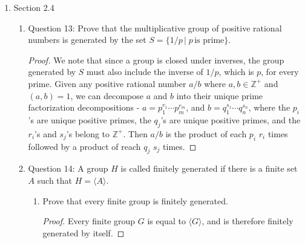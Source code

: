 \documentclass{article}
\begin{document}
\begin{enumerate}
\begin{enumerate}
\begin{enumerate}
\begin{proof}
              The given map is a homomorphism since
              $\bar{a}\bar{b}=\overline{ab}$ is mapped to $\sigma_{ab}$ by
              definition, which is equal to $\sigma_a\circ\sigma_b$ as we
              have just shown, which is equal to the image of $\bar{a}$
              composed with the image of $\bar{b}$. The given map is also
              injective by question~\ref{qn:inj}. Finally, by
              questions~\ref{qn:rel-prime} and ~\ref{qn:auto}, the map is
              surjective. Hence the map is an isomorphism.
            \end{proof}
        \end{enumerate}
    \end{enumerate}

  \item Section 2.4
    \begin{enumerate}
      \item Question 13: Prove that the multiplicative group of positive
        rational numbers is generated by the set $S=\{1/p\,|\;p\,\text{is
        prime}\}$.
        \begin{proof}
          We note that since a group is closed under inverses, the group
          generated by $S$ must also include the inverse of $1/p$, which is
          $p$, for every prime. Given any positive rational number $a/b$
          where $a,b\in\mathbb{Z}^+$ and $(a,b)=1$, we can decompose $a$
          and $b$ into their unique prime factorization decompositions -
          $a=p_1^{r_1}\cdots p_m^{r_m}$, and $b=q_1^{s_1}\cdots q_n^{s_n}$,
          where the $p_i$'s are unique positive primes, the $q_j$'s are
          unique positive primes, and the $r_i$'s and $s_j$'s belong to
          $\mathbb{Z}^+$. Then $a/b$ is the product of each $p_i$ $r_i$
          times followed by a product of reach $q_j$ $s_j$ times.
        \end{proof}

      \item Question 14: A group $H$ is called finitely generated if there
        is a finite set $A$ such that $H=\langle A\rangle$.

        \begin{enumerate}
          \item Prove that every finite group is finitely generated.
            \begin{proof}
              Every finite group $G$ is equal to $\langle
              G\rangle$, and is therefore finitely generated by itself.
            \end{proof}


\end{enumerate}
\end{enumerate}
\end{enumerate}
\end{document}
